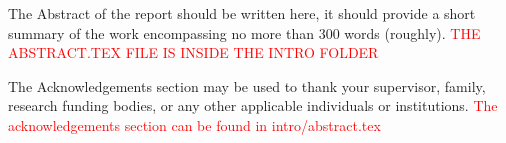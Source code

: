 \beforeabstract
{}
The Abstract of the report should be written here, it should provide a short summary of the work encompassing no more than 300 words (roughly). \textcolor{red}{THE ABSTRACT.TEX FILE IS INSIDE THE INTRO FOLDER}

The Acknowledgements section may be used to thank your supervisor, family, research funding bodies, or any other applicable individuals or institutions. \textcolor{red}{The acknowledgements section can be found in intro/abstract.tex}

\afterpreface \afterabstract
